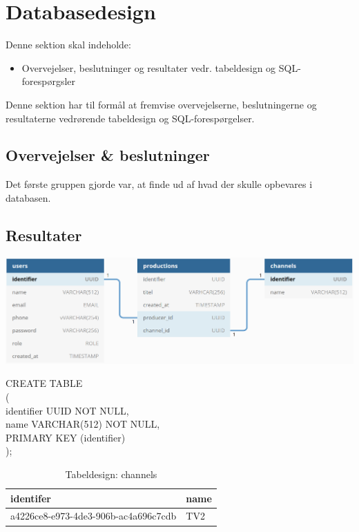 \section{Databasedesign}

Denne sektion skal indeholde:

\begin{itemize}
    \item Overvejelser, beslutninger og resultater vedr. tabeldesign og SQL-forespørgsler\\ 
\end{itemize}

\noindent
Denne sektion har til formål at fremvise overvejelserne, beslutningerne og resultaterne vedrørende tabeldesign og SQL-forespørgelser.\\

\subsection{Overvejelser \& beslutninger}
Det første gruppen gjorde var, at finde ud af hvad der skulle opbevares i databasen. 


\subsection{Resultater}
\includegraphics[scale=0.35]{figures/database_design.PNG}

\noindent
CREATE TABLE\\
(\\
identifier UUID NOT NULL,\\
name VARCHAR(512) NOT NULL,\\
PRIMARY KEY (identifier)\\
);\\

\begin{table}[ht]
    \begin{tabularx}{\textwidth}{|X|X|}
        \hline
        \textbf{identifer} &  \textbf{name}\\
        \hline
        a4226ce8-e973-4de3-906b-ac4a696c7cdb & TV2 \\
        \hline
    \end{tabularx}
    \caption{Tabeldesign: channels}
    \label{tab:channel_table}
\end{table}



